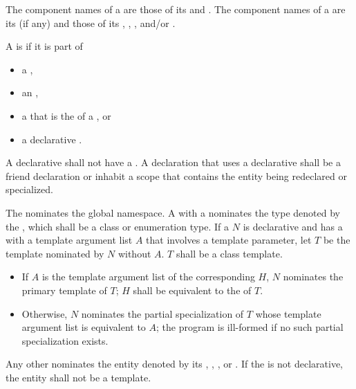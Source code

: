 \documentclass{wg21}
\begin{document}
\pnum
{}%
The component names of a  are those of
its  and .
The component names of a  are
its  (if any) and those of its
,
,
, and/or
.

\pnum
A  is  if it is part of
\begin{itemize}
    \item
    a ,
    \item
    an ,
    \item
    a 
    that is the  of a , or
    \item
    a declarative .
\end{itemize}
A declarative 
shall not have a .
A declaration that uses a declarative 
shall be a friend declaration or
inhabit a scope that contains the entity being redeclared or specialized.

\pnum
The  \tcode{::} nominates
the global namespace.
A  with a 
nominates the type denoted by the ,
which shall be a class or enumeration type.
If a  $N$
is declarative and
has a  with a template argument list $A$
that involves a template parameter,
let $T$ be the template nominated by $N$ without $A$.
$T$ shall be a class template.
\begin{itemize}
    \item
    If $A$ is the template argument list of
    the corresponding  $H$,
    $N$ nominates the primary template of $T$;
    $H$ shall be equivalent to
    the  of $T$.
    \item
    Otherwise, $N$ nominates the partial specialization of $T$
    whose template argument list is equivalent to $A$;
    the program is ill-formed if no such partial specialization exists.
\end{itemize}
Any other  nominates
the entity denoted by its
,
,
, or
.
If the  is not declarative,
the entity shall not be a template.
\end{document}
